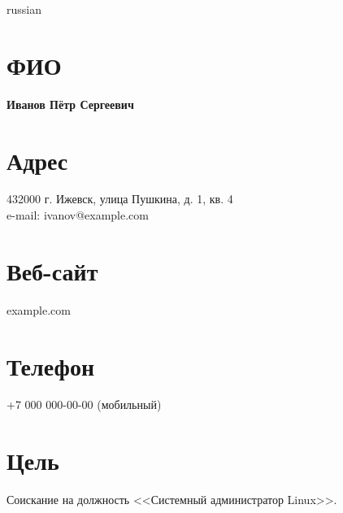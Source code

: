 \documentclass[margin, 10pt]{res}
\begin{document}
\begin{otherlanguage*}{russian}


\begin{resume}


\section{ФИО}

\textbf{Иванов Пётр Сергеевич}

\section{Адрес}

432000 г. Ижевск, улица Пушкина, д. 1, кв. 4\\
e-mail: ivanov@example.com

\section{Веб-сайт}

example.com

\section{Телефон}

+7 000 000-00-00 (мобильный)


\section{Цель}

Соискание на должность <<Системный администратор Linux>>.



\end{resume}
\end{otherlanguage*}
\end{document}
